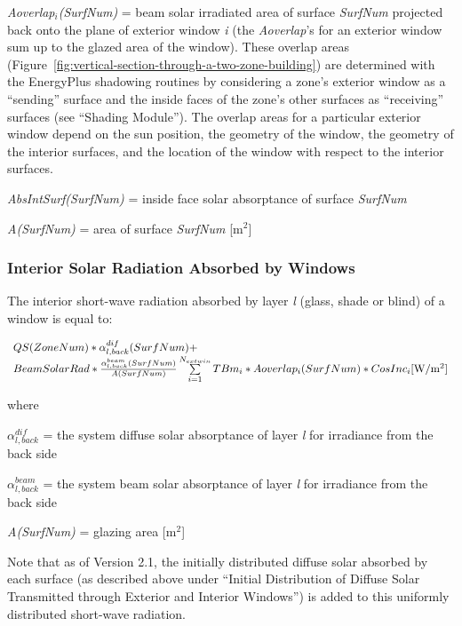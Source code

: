 \emph{Aoverlap\(_{i}\)(SurfNum)} = beam solar irradiated area of surface \emph{SurfNum} projected back onto the plane of exterior window \emph{i} (the \emph{Aoverlap}'s for an exterior window sum up to the glazed area of the window). These overlap areas (Figure~\ref{fig:vertical-section-through-a-two-zone-building}) are determined with the EnergyPlus shadowing routines by considering a zone's exterior window as a ``sending'' surface and the inside faces of the zone's other surfaces as ``receiving'' surfaces (see ``Shading Module''). The overlap areas for a particular exterior window depend on the sun position, the geometry of the window, the geometry of the interior surfaces, and the location of the window with respect to the interior surfaces.

\emph{AbsIntSurf(SurfNum)} = inside face solar absorptance of surface \emph{SurfNum}

\emph{A(SurfNum)} = area of surface \emph{SurfNum} {[}m\(^{2}\){]}

\subsubsection{Interior Solar Radiation Absorbed by Windows}\label{interior-solar-radiation-absorbed-by-windows}

The interior short-wave radiation absorbed by layer \emph{l} (glass, shade or blind) of a window is equal to:

\begin{equation}
\begin{array}{l}QS(ZoneNum)*\alpha_{l,back}^{dif}(SurfNum) + \\BeamSolarRad*\frac{{\alpha_{l,back}^{beam}(SurfNum)}}{{A(SurfNum)}}\sum\limits_{i = 1}^{{N_{extwin}}} {TB{m_i}*Aoverla{p_i}(SurfNum)} *CosIn{c_i}{\rm{ [W/}}{{\rm{m}}^{\rm{2}}}]\end{array}
\end{equation}

where

\(\alpha_{l,back}^{dif}\) = the system diffuse solar absorptance of layer \emph{l} for irradiance from the back side

\(\alpha_{l,back}^{beam}\) = the system beam solar absorptance of layer \emph{l} for irradiance from the back side

\emph{A(SurfNum)} = glazing area {[}m\(^{2}\){]}

Note that as of Version 2.1, the initially distributed diffuse solar absorbed by each surface (as described above under ``Initial Distribution of Diffuse Solar Transmitted through Exterior and Interior Windows'') is added to this uniformly distributed short-wave radiation.

